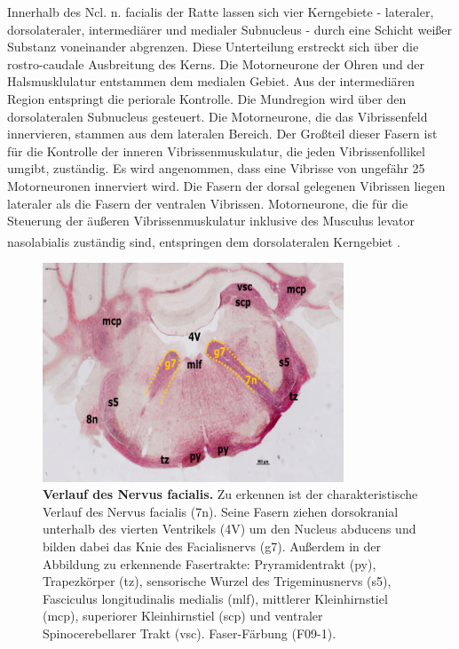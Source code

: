 \documentclass[12pt,a4paper,pdftex]{article}
\begin{document}
Innerhalb des Ncl. n. facialis der Ratte lassen sich vier Kerngebiete - lateraler, dorsolateraler, intermediärer und medialer Subnucleus - durch eine Schicht weißer Substanz voneinander abgrenzen. Diese Unterteilung erstreckt sich über die rostro-caudale Ausbreitung des Kerns. Die Motorneurone der Ohren und der Halsmusklulatur entstammen dem medialen Gebiet. Aus der intermediären Region entspringt die periorale Kontrolle. Die Mundregion wird über den dorsolateralen Subnucleus gesteuert. Die Motorneurone, die das Vibrissenfeld innervieren, stammen aus dem lateralen Bereich. Der Großteil dieser Fasern ist für die Kontrolle der inneren Vibrissenmuskulatur, die jeden Vibrissenfollikel umgibt, zuständig. Es wird angenommen, dass eine Vibrisse von ungefähr 25 Motorneuronen innerviert wird. Die Fasern der dorsal gelegenen Vibrissen liegen lateraler als die Fasern der ventralen Vibrissen. Motorneurone, die für die Steuerung der äußeren Vibrissenmuskulatur inklusive des Musculus levator nasolabialis	zuständig sind, entspringen dem dorsolateralen Kerngebiet \textsuperscript{\cite[11]{paxinos2014rat}}.   


\begin{figure}[H]
    \centering
    \includegraphics[width=0.8\textwidth]{pictures/Bilder_Laura/facialis_Nerv_F09_1png.png}
    \caption[Verlauf des Nervus facialis]{\textbf{Verlauf des Nervus facialis.} Zu erkennen ist der charakteristische Verlauf des Nervus facialis (7n). Seine Fasern ziehen dorsokranial unterhalb des vierten Ventrikels (4V) um den Nucleus abducens und bilden dabei das Knie des Facialisnervs (g7). Außerdem in der Abbildung zu erkennende Fasertrakte: Pryramidentrakt (py), Trapezkörper (tz), sensorische Wurzel des Trigeminusnervs (s5), Fasciculus longitudinalis medialis (mlf), mittlerer Kleinhirnstiel (mcp), superiorer Kleinhirnstiel (scp) und ventraler Spinocerebellarer Trakt (vsc). Faser-Färbung (F09-1).}
    \label{fig:nervus-facialis}
\end{figure}
\end{document}
